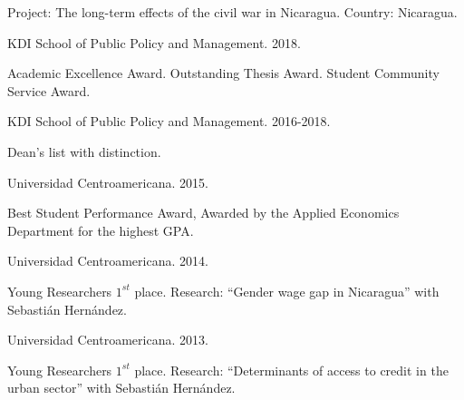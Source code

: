 \documentclass[11pt,article,oneside, a4paper]{memoir}
\begin{document}
\ind \hspace{0.35in} \footnotesize Project: The long-term effects of the civil war in Nicaragua. \newline Country: Nicaragua. \normalsize \vspace{0.01in}

\bigskip
\medskip

\ind KDI School of Public Policy and Management. 2018.

\ind \hspace{0.35in} \footnotesize Academic Excellence Award. Outstanding Thesis Award. Student Community Service Award. \normalsize \vspace{0.01in}

\ind KDI School of Public Policy and Management. 2016-2018. 

\ind \hspace{0.35in} \footnotesize Dean's list with distinction. \normalsize \vspace{0.01in}

\ind Universidad Centroamericana. 2015.

\ind \hspace{0.35in} \footnotesize Best Student Performance Award, Awarded by the Applied Economics Department for the highest GPA. \normalsize \vspace{0.01in}

\ind Universidad Centroamericana. 2014. 

\ind \hspace{0.35in} \footnotesize Young Researchers $1^{st}$ place. Research: ``Gender wage gap in Nicaragua'' with Sebastián Hernández. \normalsize \vspace{0.01in}

\ind Universidad Centroamericana. 2013. 

\ind \hspace{0.35in} \footnotesize Young Researchers $1^{st}$ place. Research: ``Determinants of access to credit in the urban sector'' with Sebastián Hernández. \normalsize \vspace{0.01in}

\bigskip
\end{document}
